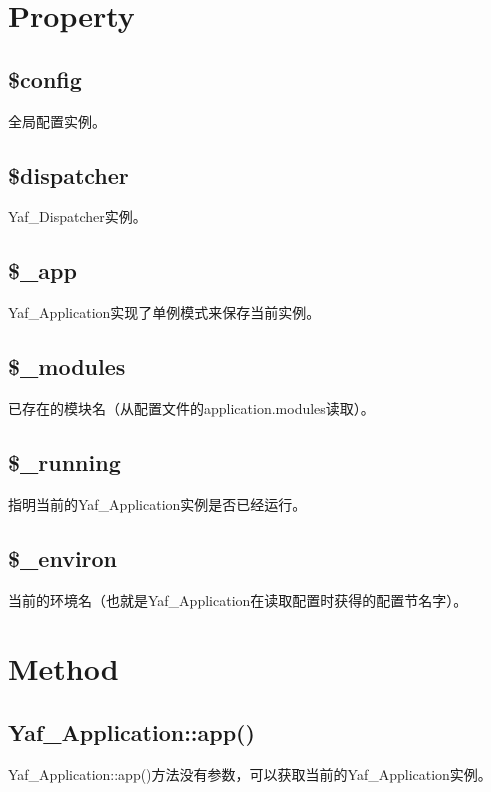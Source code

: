 \section{Property}


\subsection{\$config}

全局配置实例。

\subsection{\$dispatcher}

Yaf\_Dispatcher实例。

\subsection{\$\_app}

Yaf\_Application实现了单例模式来保存当前实例。

\subsection{\$\_modules}

已存在的模块名（从配置文件的application.modules读取）。


\subsection{\$\_running}

指明当前的Yaf\_Application实例是否已经运行。

\subsection{\$\_environ}

当前的环境名（也就是Yaf\_Application在读取配置时获得的配置节名字）。

\section{Method}


\subsection{Yaf\_Application::app()}

Yaf\_Application::app()方法没有参数，可以获取当前的Yaf\_Application实例。

